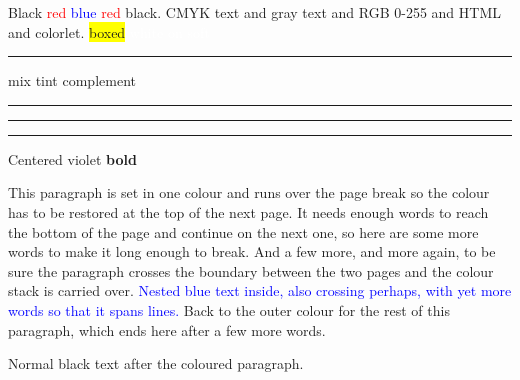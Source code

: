 \documentclass{article}
\begin{document}
Black \textcolor{red}{red \textcolor{blue}{blue} red} black.
{\color[cmyk]{0.1,0.8,0.2,0.05} CMYK text} and {\color[gray]{0.5} gray text}
and {\color[RGB]{200,100,0} RGB 0-255} and \textcolor{mine}{HTML} and \textcolor{soft}{colorlet}.
\colorbox{yellow}{boxed}  \colorbox{soft}{\textcolor{white}{white on soft}}
{\color{RoyalBlue!60!black}\rule{3cm}{2pt}} \textcolor{green!40!black}{mix}
\textcolor{red!50}{tint} \textcolor{-red}{complement} {\color{gray}\rule{1cm}{1cm}}
\rule{4cm}{0.4pt} {\color{red}\rule[-1pt]{0.5pt}{8pt}}
\begin{center}\color{violet}Centered violet \textbf{bold}\end{center}
\vspace*{\fill}
{\color{Bittersweet}This paragraph is set in one colour and runs over the page break so the
colour has to be restored at the top of the next page. It needs enough words to reach the bottom of
the page and continue on the next one, so here are some more words to make it long enough to break.
And a few more, and more again, to be sure the paragraph crosses the boundary between the two pages
and the colour stack is carried over. \textcolor{blue}{Nested blue text inside, also crossing perhaps,
with yet more words so that it spans lines.} Back to the outer colour for the rest of this paragraph,
which ends here after a few more words.\par}
Normal black text after the coloured paragraph.
\end{document}
